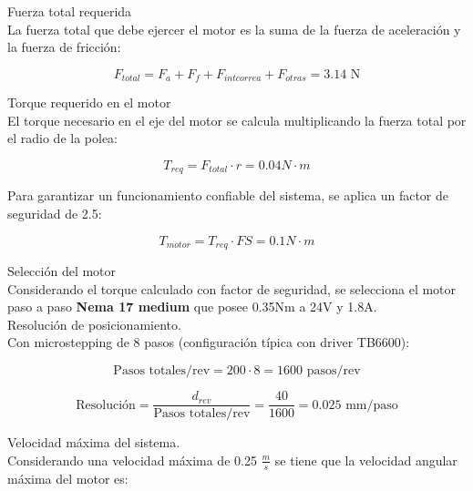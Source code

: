 Fuerza total requerida\\
\noindent
La fuerza total que debe ejercer el motor es la suma de la fuerza de aceleración y la fuerza de fricción:

\begin{equation}
    F_{total} = F_a + F_f + F_{intcorrea} + F_{otras} = 3.14 \text{ N}
\end{equation}

Torque requerido en el motor\\
\noindent
El torque necesario en el eje del motor se calcula multiplicando la fuerza total por el radio de la polea:

\begin{equation}
    T_{req} = F_{total} \cdot r = 0.04  N \cdot m
\end{equation}

Para garantizar un funcionamiento confiable del sistema, se aplica un factor de seguridad de 2.5:

\begin{equation}
    T_{motor} = T_{req} \cdot FS = 0.1 N \cdot m
\end{equation}

Selección del motor\\
\noindent
Considerando el torque calculado con factor de seguridad, se selecciona el motor paso a paso  \textbf{Nema 17 medium} que posee  0.35Nm a 24V y 1.8A. \\

Resolución de posicionamiento.\\
\noindent
Con microstepping de 8 pasos (configuración típica con driver TB6600):

\begin{equation}
    \text{Pasos totales/rev} = 200 \cdot 8 = 1600 \text{ pasos/rev}
\end{equation}

\begin{equation}
    \text{Resolución} = \frac{d_{rev}}{\text{Pasos totales/rev}} = \frac{40}{1600} = 0.025 \text{ mm/paso}
\end{equation}

Velocidad máxima del sistema.\\
\noindent
Considerando una velocidad máxima de 0.25 \(\frac{m}{s}\) se tiene que la velocidad angular máxima del motor es:

